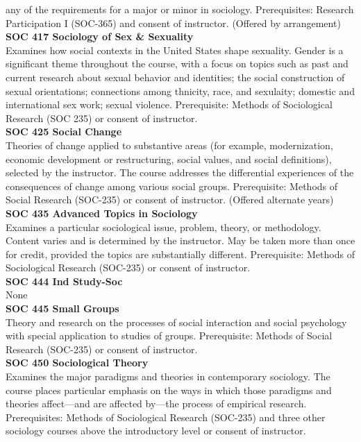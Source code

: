 \documentclass[
  letterpaper,
]{scrbook}
\begin{document}
any of the requirements for a major or minor in sociology.
Prerequisites: Research Participation I (SOC-365) and consent of
instructor. (Offered by arrangement)\\
\textbf{SOC 417 Sociology of Sex \& Sexuality}\\
Examines how social contexts in the United States shape sexuality.
Gender is a significant theme throughout the course, with a focus on
topics such as past and current research about sexual behavior and
identities; the social construction of sexual orientations; connections
among thnicity, race, and sexulaity; domestic and international sex
work; sexual violence. Prerequisite: Methods of Sociological Research
(SOC 235) or consent of instructor.\\
\textbf{SOC 425 Social Change}\\
Theories of change applied to substantive areas (for example,
modernization, economic development or restructuring, social values, and
social definitions), selected by the instructor. The course addresses
the differential experiences of the consequences of change among various
social groups. Prerequisite: Methods of Social Research (SOC-235) or
consent of instructor. (Offered alternate years)\\
\textbf{SOC 435 Advanced Topics in Sociology}\\
Examines a particular sociological issue, problem, theory, or
methodology. Content varies and is determined by the instructor. May be
taken more than once for credit, provided the topics are substantially
different. Prerequisite: Methods of Sociological Research (SOC-235) or
consent of instructor.\\
\textbf{SOC 444 Ind Study-Soc}\\
None\\
\textbf{SOC 445 Small Groups}\\
Theory and research on the processes of social interaction and social
psychology with special application to studies of groups. Prerequisite:
Methods of Social Research (SOC-235) or consent of instructor.\\
\textbf{SOC 450 Sociological Theory}\\
Examines the major paradigms and theories in contemporary sociology. The
course places particular emphasis on the ways in which those paradigms
and theories affect---and are affected by---the process of empirical
research. Prerequisites: Methods of Sociological Research (SOC-235) and
three other sociology courses above the introductory level or consent of
instructor.\\
\end{document}
